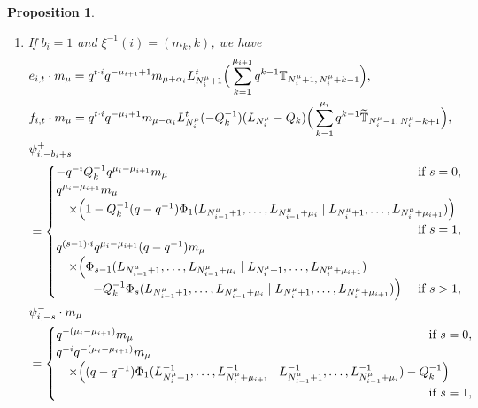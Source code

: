 \documentclass[12pt]{amsart}
\newtheorem{prop}[thm]{Proposition}
\numberwithin{equation}{thm}
\newcommand\TT{\mathbb T}
\renewcommand\a{\alpha}  %
\newcommand\wt{\widetilde}
\begin{document}
\begin{prop}
\begin{enumerate}
\item 
If $b_i=1$ and $\xi^{-1} (i) =(m_k,k)$, we have 
\begin{align*}
&e_{i,t} \cdot m_{\mu} 
	= q^{t \cdot i} q^{- \mu_{i+1} +1}  m_{\mu + \a_i} L_{N_i^{\mu}+1}^t 
		\Big( \sum_{k=1}^{\mu_{i+1}} q^{k-1} \TT_{N_i^{\mu} +1, \, N_i^{\mu} + k-1}\Big), 
\\
&f_{i,t} \cdot m_{\mu} 
	= q^{t \cdot i} q^{- \mu_i +1} m_{\mu - \a_i} L_{N_i^{\mu}}^t 
		(-Q_k^{-1})  (L_{N_i^{\mu}} - Q_k) \Big( \sum_{k=1}^{\mu_i} q^{k-1} \wt{\TT}_{N_i^{\mu}-1, \, N_i^{\mu} -k +1} \Big), 
\\
&\psi_{i, - b_i +s}^+ 
	\\&= \begin{cases}
		- q^{-i} Q_k^{-1} q^{\mu_i - \mu_{i+1}} m_{\mu} 
			& \text{ if } s=0, 
		\\ 
		q^{\mu_i-\mu_{i+1}} m_{\mu} 
		\\ \quad  \times 
		\Big( 1 - Q_k^{-1} (q-q^{-1}) 
			\Phi_1 (L_{N_{i-1}^{\mu}+1}, \dots, L_{N_{i-1}^{\mu} +\mu_i} \mid L_{N_i^{\mu} +1}, \dots, L_{N_i^{\mu} + \mu_{i+1}}) 
		\Big) \hspace{-5em} 
			\\ & \text{ if } s =1, 
		\\
		q^{ (s-1)\cdot i} q^{\mu_i - \mu_{i+1}} (q-q^{-1}) m_{\mu} 
		\\ \quad \times 
		\Big( \Phi_{s-1} (L_{N_{i-1}^{\mu}+1}, \dots, L_{N_{i-1}^{\mu} +\mu_i} 
						\mid L_{N_i^{\mu} +1}, \dots, L_{N_i^{\mu} + \mu_{i+1}}) 
			\\ \hspace{3em} 
			- Q_k^{-1} \Phi_s (L_{N_{i-1}^{\mu}+1}, \dots, L_{N_{i-1}^{\mu} +\mu_i} 
							\mid L_{N_i^{\mu} +1}, \dots, L_{N_i^{\mu} + \mu_{i+1}}) \Big)
			 & \text{ if } s >1,
	\end{cases}
\\
& \psi_{i,-s}^- \cdot m_{\mu} 
	\\ &= \begin{cases}
		q^{- (\mu_i - \mu_{i+1})} m_{\mu} 
			& \text{ if } s=0, 
		\\ 
		q^{- i} q^{ - (\mu_i - \mu_{i+1})} m_{\mu} 
		\\ \quad \times 
		\Big( (q-q^{-1}) \Phi_1 (L_{N_i^{\mu}+1}^{-1}, \dots, L_{N_i^{\mu} + \mu_{i+1}}^{-1} 
				\mid L_{N_{i-1}^{\mu} +1}^{-1}, \dots, L_{N_{i-1}^{\mu} + \mu_i}^{-1} )  
			- Q_k^{-1} \Big) \hspace{-3em} 
			\\ & \text{ if } s=1,  
		\\ 

\end{cases}
\end{align*}
\end{enumerate}
\end{prop}
\end{document}
